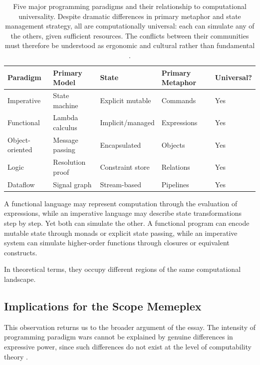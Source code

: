 \documentclass[11pt]{article}
\theoremstyle{definition}
\begin{document}
\begin{table}[h]
\centering
\small
\begin{tabular}{lllll}
\toprule
\textbf{Paradigm} & \textbf{Primary Model} & \textbf{State} &
  \textbf{Primary Metaphor} & \textbf{Universal?} \\
\midrule
Imperative       & State machine       & Explicit mutable & Commands          & Yes \\
Functional       & Lambda calculus     & Implicit/managed & Expressions       & Yes \\
Object-oriented  & Message passing     & Encapsulated     & Objects           & Yes \\
Logic            & Resolution proof    & Constraint store & Relations         & Yes \\
Dataflow         & Signal graph        & Stream-based     & Pipelines         & Yes \\
\bottomrule
\end{tabular}
\caption{Five major programming paradigms and their relationship to
computational universality. Despite dramatic differences in primary
metaphor and state management strategy, all are computationally
universal: each can simulate any of the others, given sufficient
resources. The conflicts between their communities must therefore be
understood as ergonomic and cultural rather than fundamental
\cite{backus1978,kleene1952}.}
\label{tab:paradigms}
\end{table}

A functional language may represent computation through the evaluation
of expressions, while an imperative language may describe state
transformations step by step. Yet both can simulate the other. A
functional program can encode mutable state through monads or explicit
state passing, while an imperative system can simulate higher-order
functions through closures or equivalent constructs.

In theoretical terms, they occupy different regions of the same
computational landscape.

\subsection{Implications for the Scope Memeplex}

This observation returns us to the broader argument of the essay. The
intensity of programming paradigm wars cannot be explained by genuine
differences in expressive power, since such differences do not exist at
the level of computability theory \cite{kleene1952}.
\end{document}
